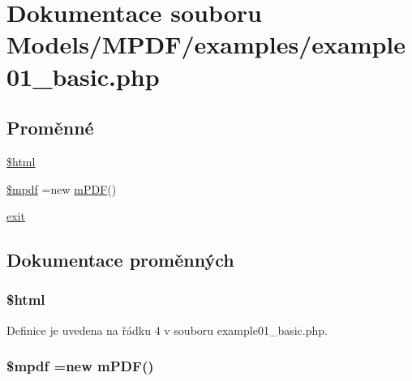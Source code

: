 \hypertarget{example01__basic_8php}{\section{Dokumentace souboru Models/\-M\-P\-D\-F/examples/example01\-\_\-basic.php}
\label{example01__basic_8php}
}
\subsection*{Proměnné}
\begin{DoxyCompactItemize}
\item 
\hyperlink{example01__basic_8php_a6f96e7fc92441776c9d1cd3386663b40}{\$html}
\item 
\hyperlink{example01__basic_8php_ad028f81910d6cbab9b184d2214b3a8f8}{\$mpdf} =new \hyperlink{classm_p_d_f}{m\-P\-D\-F}()
\item 
\hyperlink{example01__basic_8php_a6733eb5f605d09eaede9845835d71c4e}{exit}
\end{DoxyCompactItemize}


\subsection{Dokumentace proměnných}
\hypertarget{example01__basic_8php_a6f96e7fc92441776c9d1cd3386663b40}{
\subsubsection[{\$html}]{\setlength{\rightskip}{0pt plus 5cm}\$html}}\label{example01__basic_8php_a6f96e7fc92441776c9d1cd3386663b40}


Definice je uvedena na řádku 4 v souboru example01\-\_\-basic.\-php.

\hypertarget{example01__basic_8php_ad028f81910d6cbab9b184d2214b3a8f8}{
\subsubsection[{\$mpdf}]{\setlength{\rightskip}{0pt plus 5cm}\$mpdf =new {\bf m\-P\-D\-F}()}}\label{example01__basic_8php_ad028f81910d6cbab9b184d2214b3a8f8}


